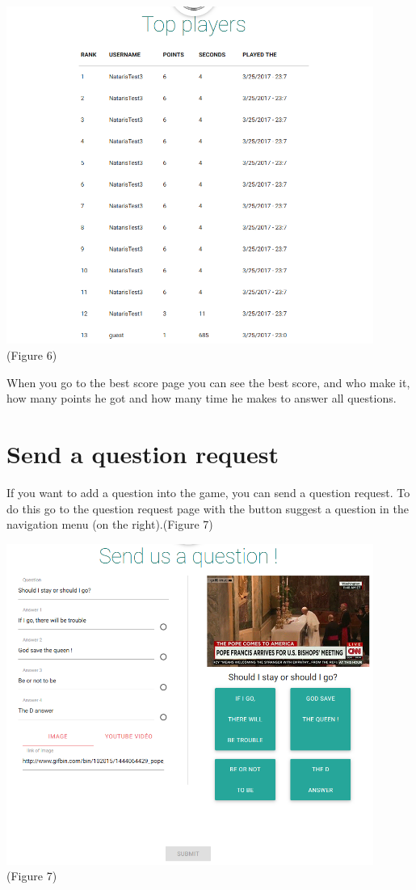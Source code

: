 \documentclass[a4paper,11pt, oneside]{book}
\begin{document}
\begin{center}
	\includegraphics[width=0.9\textwidth]{bestScore.png}\\
	(Figure 6)
\end{center}

When you go to the best score page you can see the best score, and who make it, how many points he got and how many time he makes to answer all questions.

\section{Send a question request}
If you want to add a question into the game, you can send a question request.
To do this go to the question request page with the button suggest a question in the navigation menu (on the right).(Figure 7)

\begin{center}
	\includegraphics[width=0.9\textwidth]{CQuestion.png}\\
	(Figure 7)
\end{center}
\end{document}
